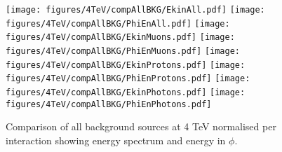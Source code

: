 \begin{figure}
\begin{center}
  \texttt{[image: figures/4TeV/compAllBKG/EkinAll.pdf]}
  \texttt{[image: figures/4TeV/compAllBKG/PhiEnAll.pdf]}
  \texttt{[image: figures/4TeV/compAllBKG/EkinMuons.pdf]}
  \texttt{[image: figures/4TeV/compAllBKG/PhiEnMuons.pdf]}
  \texttt{[image: figures/4TeV/compAllBKG/EkinProtons.pdf]}
  \texttt{[image: figures/4TeV/compAllBKG/PhiEnProtons.pdf]}
  \texttt{[image: figures/4TeV/compAllBKG/EkinPhotons.pdf]}
  \texttt{[image: figures/4TeV/compAllBKG/PhiEnPhotons.pdf]}
\end{center}
\vspace{-0.6cm}
 \caption{Comparison of all background sources at 4 TeV normalised per interaction showing energy spectrum and energy in $\phi$.
  \label{fig:compAllBKG_perInt1}}
\end{figure}



